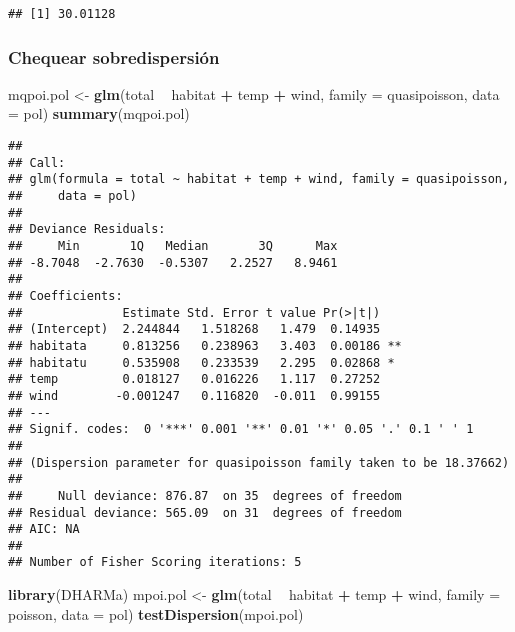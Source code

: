 \documentclass[
]{book}
\newenvironment{Shaded}{\begin{snugshade}}{\end{snugshade}}
\newcommand{\DataTypeTok}[1]{\textcolor[rgb]{0.13,0.29,0.53}{#1}}
\newcommand{\KeywordTok}[1]{\textcolor[rgb]{0.13,0.29,0.53}{\textbf{#1}}}
\newcommand{\NormalTok}[1]{#1}
\newcommand{\OperatorTok}[1]{\textcolor[rgb]{0.81,0.36,0.00}{\textbf{#1}}}
\newcommand{\StringTok}[1]{\textcolor[rgb]{0.31,0.60,0.02}{#1}}
\begin{document}
\begin{Shaded}
\end{Shaded}

\begin{verbatim}
## [1] 30.01128
\end{verbatim}

\hypertarget{chequear-sobredispersiuxf3n}{%
\subsubsection{Chequear sobredispersión}\label{chequear-sobredispersiuxf3n}}

\begin{Shaded}
\begin{Highlighting}[]
\NormalTok{mqpoi.pol <-}\StringTok{ }\KeywordTok{glm}\NormalTok{(total }\OperatorTok{~}\StringTok{ }\NormalTok{habitat }\OperatorTok{+}\StringTok{ }\NormalTok{temp }\OperatorTok{+}\StringTok{ }\NormalTok{wind, }\DataTypeTok{family =}\NormalTok{ quasipoisson, }\DataTypeTok{data =}\NormalTok{ pol) }
\KeywordTok{summary}\NormalTok{(mqpoi.pol)}
\end{Highlighting}
\end{Shaded}

\begin{verbatim}
## 
## Call:
## glm(formula = total ~ habitat + temp + wind, family = quasipoisson, 
##     data = pol)
## 
## Deviance Residuals: 
##     Min       1Q   Median       3Q      Max  
## -8.7048  -2.7630  -0.5307   2.2527   8.9461  
## 
## Coefficients:
##              Estimate Std. Error t value Pr(>|t|)   
## (Intercept)  2.244844   1.518268   1.479  0.14935   
## habitata     0.813256   0.238963   3.403  0.00186 **
## habitatu     0.535908   0.233539   2.295  0.02868 * 
## temp         0.018127   0.016226   1.117  0.27252   
## wind        -0.001247   0.116820  -0.011  0.99155   
## ---
## Signif. codes:  0 '***' 0.001 '**' 0.01 '*' 0.05 '.' 0.1 ' ' 1
## 
## (Dispersion parameter for quasipoisson family taken to be 18.37662)
## 
##     Null deviance: 876.87  on 35  degrees of freedom
## Residual deviance: 565.09  on 31  degrees of freedom
## AIC: NA
## 
## Number of Fisher Scoring iterations: 5
\end{verbatim}

\begin{Shaded}
\begin{Highlighting}[]
\KeywordTok{library}\NormalTok{(DHARMa)}
\NormalTok{mpoi.pol <-}\StringTok{ }\KeywordTok{glm}\NormalTok{(total }\OperatorTok{~}\StringTok{ }\NormalTok{habitat }\OperatorTok{+}\StringTok{ }\NormalTok{temp }\OperatorTok{+}\StringTok{ }\NormalTok{wind, }\DataTypeTok{family =}\NormalTok{ poisson, }\DataTypeTok{data =}\NormalTok{ pol)}
\KeywordTok{testDispersion}\NormalTok{(mpoi.pol)}
\end{Highlighting}
\end{Shaded}
\end{document}
